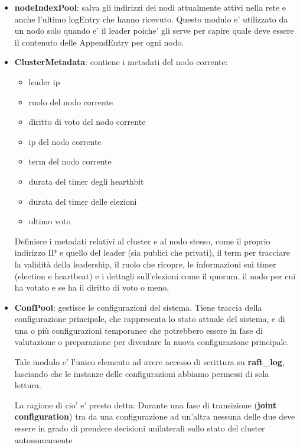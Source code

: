 \begin{itemize}
    \item \textbf{nodeIndexPool}: 
        salva gli indirizzi dei nodi attualmente attivi nella rete e anche l'ultimo logEntry
        che hanno ricevuto. Questo modulo e' utilizzato da un nodo solo quando e' il leader
        poiche' gli serve per capire quale deve essere il contenuto delle AppendEntry per ogni nodo.
    \item \textbf{ClusterMetadata}: contiene i metadati del nodo corrente:
        \begin{itemize}
            \item leader ip
            \item ruolo del nodo corrente
            \item diritto di voto del nodo corrente
            \item ip del nodo corrente
            \item term del nodo corrente
            \item durata del timer degli hearthbit 
            \item durata del timer delle elezioni
            \item ultimo voto
        \end{itemize}
        Definisce i metadati relativi al cluster e al nodo stesso, come il proprio indirizzo IP e quello del leader (sia publici che privati), il term per tracciare la validità della leadership, il ruolo 
        che ricopre, le informazioni sui timer (election e heartbeat) e i dettagli 
        sull'elezioni come il quorum, il nodo per cui ha votato e se ha il diritto di voto o meno, 

    \item \textbf{ConfPool}: 
        gestisce le configurazioni del sistema. Tiene traccia della configurazione principale, 
        che rappresenta lo stato attuale del sistema, e di una o più configurazioni temporanee 
        che potrebbero essere in fase di valutazione o preparazione per diventare la nuova 
        configurazione principale. 

        Tale modulo e' l'unico elemento ad avere accesso di scrittura su \textbf{raft\_log},
        lasciando che le instanze delle configurazioni abbiamo permessi di sola lettura.

        La ragione di cio' e' presto detta: 
        Durante una fase di transizione (\textbf{joint configuration}) tra da una configurazione 
        ad un'altra nessuna delle due
        deve essere in grado di prendere decisioni unilaterali sullo stato del cluster autonomamente


\end{itemize}
